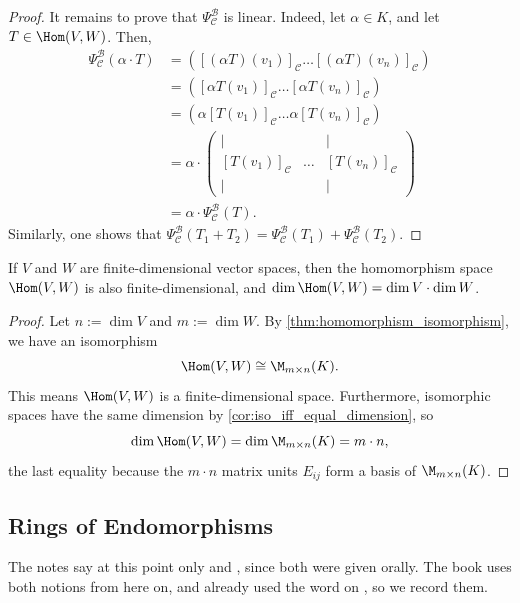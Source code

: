 \begin{proof}
  It remains to prove that $\Psi_{\mathcal{C}}^{\mathcal{B}}$ is linear. Indeed, let $\alpha \in K$, and let $T \in \Hom(V,W)$. Then,
  \begin{align*}
    \Psi_{\mathcal{C}}^{\mathcal{B}}(\alpha \cdot T) &= \left( [(\alpha T)(v_1)]_{\mathcal{C}} \dots [(\alpha T)(v_n)]_{\mathcal{C}} \right) \\
    &= \left( [\alpha T(v_1)]_{\mathcal{C}} \dots [\alpha T(v_n)]_{\mathcal{C}} \right) \\
    &= \left( \alpha [T(v_1)]_{\mathcal{C}} \dots \alpha [T(v_n)]_{\mathcal{C}} \right) \\
    &= \alpha \cdot \begin{pmatrix} | & & | \\ [T(v_1)]_{\mathcal{C}} & \dots & [T(v_n)]_{\mathcal{C}} \\ | & & | \end{pmatrix} \\
    &= \alpha \cdot \Psi_{\mathcal{C}}^{\mathcal{B}}(T).
  \end{align*}
  Similarly, one shows that $\Psi_{\mathcal{C}}^{\mathcal{B}}(T_1 + T_2) = \Psi_{\mathcal{C}}^{\mathcal{B}}(T_1) + \Psi_{\mathcal{C}}^{\mathcal{B}}(T_2)$.
\end{proof}

\begin{corollary}
  \label{cor:dim_hom}
  If $V$ and $W$ are finite-di\-men\-sional vector spaces, then the homomorphism space $\Hom(V,W)$ is also finite-di\-men\-sional, and $\dim \Hom(V,W) = \dim V \cdot \dim W$.
\end{corollary}

\begin{proof}
  Let $n := \dim V$ and $m := \dim W$. By \cref{thm:homomorphism_isomorphism}, we have an isomorphism
  \[
  \Hom(V,W) \cong \M_{m \times n}(K).
  \]
  This means $\Hom(V,W)$ is a finite-di\-men\-sional space. Furthermore, isomorphic spaces have the same dimension by \cref{cor:iso_iff_equal_dimension}, so
  \[
  \dim \Hom(V,W) = \dim \M_{m \times n}(K) = m \cdot n,
  \]
  the last equality because the $m \cdot n$ matrix units $E_{ij}$ form a basis of $\M_{m \times n}(K)$.
\end{proof}

\subsection{Rings of Endomorphisms}

The notes say at this point only 
and , since both were given orally.
The book uses both notions from here on, and already used the word
 on , so we record them.

